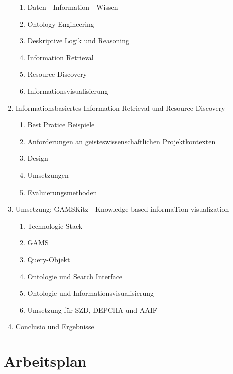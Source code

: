 \documentclass[12pt,a4paper]{article}
\begin{document}
\begin{enumerate}
\begin{enumerate}
    \item Daten - Information - Wissen
    \item Ontology Engineering
    \item Deskriptive Logik und Reasoning
    \item Information Retrieval 
    \item Resource Discovery
    \item Informationsvisualisierung
  \end{enumerate}
  \item Informationsbasiertes Information Retrieval und Resource Discovery  
   \begin{enumerate}
    \item Best Pratice Beispiele
    \item Anforderungen an geisteswissenschaftlichen Projektkontexten
    \item Design 
    \item Umsetzungen
    \item Evaluierungsmethoden
  \end{enumerate}
  \item Umsetzung: GAMSKitz - Knowledge-based informaTion visualization
  \begin{enumerate}
  	\item Technologie Stack
    \item GAMS
    \item Query-Objekt
    \item Ontologie und Search Interface
    \item Ontologie und Informationsvisualisierung 
    \item Umsetzung für SZD, DEPCHA und AAIF 
  \end{enumerate}
  \item Conclusio und Ergebnisse
\end{enumerate}
\newpage
\section{Arbeitsplan}
\end{document}
